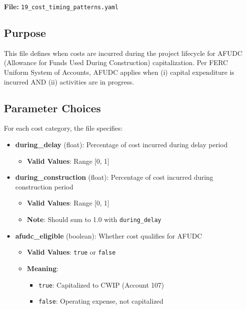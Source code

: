 \documentclass[ctcc_full_documentation.tex]{subfiles}
\begin{document}
\textbf{File:} \texttt{19\_cost\_timing\_patterns.yaml}

\subsection{Purpose}

This file defines when costs are incurred during the project lifecycle for AFUDC (Allowance for Funds Used During Construction) capitalization. Per FERC Uniform System of Accounts, AFUDC applies when (i) capital expenditure is incurred AND (ii) activities are in progress.

\subsection{Parameter Choices}

For each cost category, the file specifies:

\begin{itemize}
    \item \textbf{during\_delay} (float): Percentage of cost incurred during delay period
    \begin{itemize}
        \item \textbf{Valid Values}: Range [0, 1]
    \end{itemize}
    
    \item \textbf{during\_construction} (float): Percentage of cost incurred during construction period
    \begin{itemize}
        \item \textbf{Valid Values}: Range [0, 1]
        \item \textbf{Note}: Should sum to 1.0 with \texttt{during\_delay}
    \end{itemize}
    
    \item \textbf{afudc\_eligible} (boolean): Whether cost qualifies for AFUDC
    \begin{itemize}
        \item \textbf{Valid Values}: \texttt{true} or \texttt{false}
        \item \textbf{Meaning}: 
        \begin{itemize}
            \item \texttt{true}: Capitalized to CWIP (Account 107)
            \item \texttt{false}: Operating expense, not capitalized
        \end{itemize}
    \end{itemize}
\end{itemize}
\end{document}
